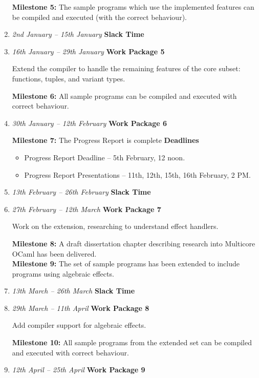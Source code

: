 \documentclass[a4paper,12pt]{article}
\begin{document}
\begin{enumerate}[label=\textbf{Slot \arabic*} -,start = 0]
 \textbf{Milestone 5:} The sample programs which use the implemented features can be compiled and executed (with the correct behaviour).
 \item
 \emph{2nd January -- 15th January} \hfill \textbf{Slack Time}

 \item
 \emph{16th January -- 29th January} \hfill \textbf{Work Package 5}

 Extend the compiler to handle the remaining features of the core subset: functions, tuples, and variant types.

 \textbf{Milestone 6:} All sample programs can be compiled and executed with correct behaviour.
 \item
 \emph{30th January -- 12th February} \hfill \textbf{Work Package 6}

 \textbf{Milestone 7:} The Progress Report is complete
 \textbf{Deadlines}
 \begin{itemize}
  \item
  Progress Report Deadline -- 5th February, 12 noon.
  \item
  Progress Report Presentations -- 11th, 12th, 15th, 16th February, 2 PM.
 \end{itemize}

 \item
 \emph{13th February -- 26th February} \hfill \textbf{Slack Time}

 \item
 \emph{27th February -- 12th March} \hfill \textbf{Work Package 7}

 Work on the extension, researching to understand effect handlers.

 \textbf{Milestone 8:} A draft dissertation chapter describing research into Multicore OCaml has been delivered.   \\
 \textbf{Milestone 9:} The set of sample programs has been extended to include programs using algebraic effects.

 \item
 \emph{13th March -- 26th March} \hfill \textbf{Slack Time}

 \item
 \emph{29th March -- 11th April} \hfill \textbf{Work Package 8}

 Add compiler support for algebraic effects.

 \textbf{Milestone 10:} All sample programs from the extended set can be compiled and executed with correct behaviour.

 \item
 \emph{12th April -- 25th April} \hfill \textbf{Work Package 9}


\end{enumerate}
\end{document}
